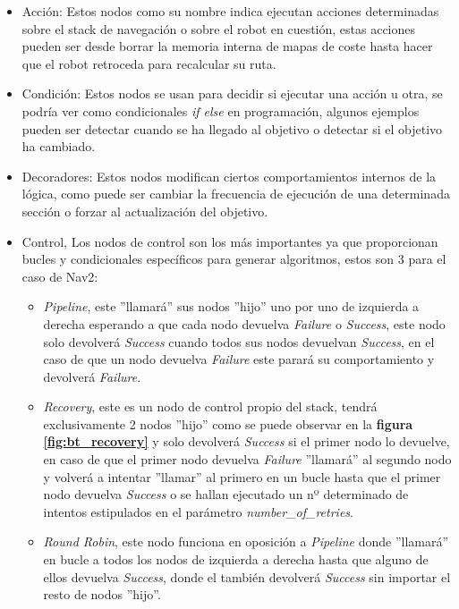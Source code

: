 \begin{itemize}
    \item Acción: Estos nodos como su nombre indica ejecutan acciones determinadas sobre el stack de navegación o sobre el robot en cuestión, estas acciones pueden ser desde borrar la memoria interna de mapas de coste hasta hacer que el robot retroceda para recalcular su ruta.
    \item Condición: Estos nodos se usan para decidir si ejecutar una acción u otra, se podría ver como condicionales \textit{if{} else{}} en programación, algunos ejemplos pueden ser detectar cuando se ha llegado al objetivo o detectar si el objetivo ha cambiado.
    \item Decoradores: Estos nodos modifican ciertos comportamientos internos de la lógica, como puede ser cambiar la frecuencia de ejecución de una determinada sección o forzar al actualización del objetivo.
    \item Control, Los nodos de control son los más importantes ya que proporcionan bucles y condicionales específicos para generar algoritmos, estos son 3 para el caso de Nav2:
    \begin{itemize}
        \item \textit{Pipeline}, este ''llamará'' sus nodos ''hijo'' uno por uno de izquierda a derecha esperando a que cada nodo devuelva \textit{Failure} o \textit{Success}, este nodo solo devolverá \textit{Success} cuando todos sus nodos devuelvan \textit{Success}, en el caso de que un nodo devuelva \textit{Failure} este parará su comportamiento y devolverá \textit{Failure}.
        \item \textit{Recovery}, este es un nodo de control propio del stack, tendrá exclusivamente 2 nodos ''hijo'' como se puede observar en la \textbf{figura \ref{fig:bt_recovery}} y solo devolverá \textit{Success} si el primer nodo lo devuelve, en caso de que el primer nodo devuelva \textit{Failure} ''llamará'' al segundo nodo y volverá a intentar ''llamar'' al primero en un bucle hasta que el primer nodo devuelva \textit{Success} o se hallan ejecutado un nº determinado de intentos estipulados en el parámetro \textit{number\_of\_retries}.
        \item \textit{Round Robin}, este nodo funciona en oposición a \textit{Pipeline} donde ''llamará'' en bucle a todos los nodos de izquierda a derecha hasta que alguno de ellos devuelva \textit{Success}, donde el también devolverá \textit{Success} sin importar el resto de nodos ''hijo''.
    \end{itemize}
\end{itemize}

